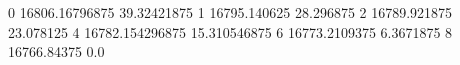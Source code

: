 0 16806.16796875 39.32421875
1 16795.140625 28.296875
2 16789.921875 23.078125
4 16782.154296875 15.310546875
6 16773.2109375 6.3671875
8 16766.84375 0.0
